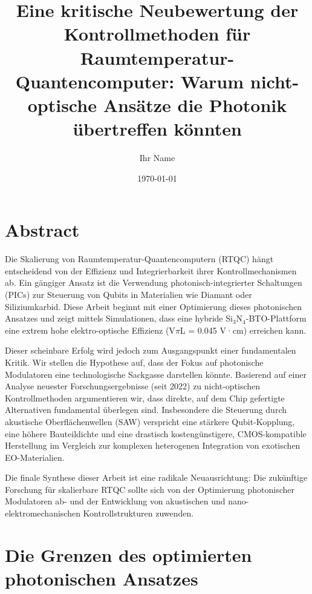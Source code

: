 \documentclass[12pt, a4paper, numbers]{report}
\title{Eine kritische Neubewertung der Kontrollmethoden für Raumtemperatur-Quantencomputer: Warum nicht-optische Ansätze die Photonik übertreffen könnten}
\author{Ihr Name}
\date{\today}
\begin{document}

\maketitle
\tableofcontents
\listoffigures
\listoftables

\chapter*{Abstract}
Die Skalierung von Raumtemperatur-Quantencomputern (RTQC) hängt entscheidend von der Effizienz und Integrierbarkeit ihrer Kontrollmechanismen ab. Ein gängiger Ansatz ist die Verwendung photonisch-integrierter Schaltungen (PICs) zur Steuerung von Qubits in Materialien wie Diamant oder Siliziumkarbid. Diese Arbeit beginnt mit einer Optimierung dieses photonischen Ansatzes und zeigt mittels Simulationen, dass eine hybride Si$_3$N$_4$-BTO-Plattform eine extrem hohe elektro-optische Effizienz (V$\pi$L = 0.045 V·cm) erreichen kann.

Dieser scheinbare Erfolg wird jedoch zum Ausgangspunkt einer fundamentalen Kritik. Wir stellen die Hypothese auf, dass der Fokus auf photonische Modulatoren eine technologische Sackgasse darstellen könnte. Basierend auf einer Analyse neuester Forschungsergebnisse (seit 2022) zu nicht-optischen Kontrollmethoden argumentieren wir, dass direkte, auf dem Chip gefertigte Alternativen fundamental überlegen sind. Insbesondere die Steuerung durch akustische Oberflächenwellen (SAW) verspricht eine stärkere Qubit-Kopplung, eine höhere Bauteildichte und eine drastisch kostengünstigere, CMOS-kompatible Herstellung im Vergleich zur komplexen heterogenen Integration von exotischen EO-Materialien.

Die finale Synthese dieser Arbeit ist eine radikale Neuausrichtung: Die zukünftige Forschung für skalierbare RTQC sollte sich von der Optimierung photonischer Modulatoren ab- und der Entwicklung von akustischen und nano-elektromechanischen Kontrollstrukturen zuwenden.

\chapter{Die Grenzen des optimierten photonischen Ansatzes}
\end{document}
